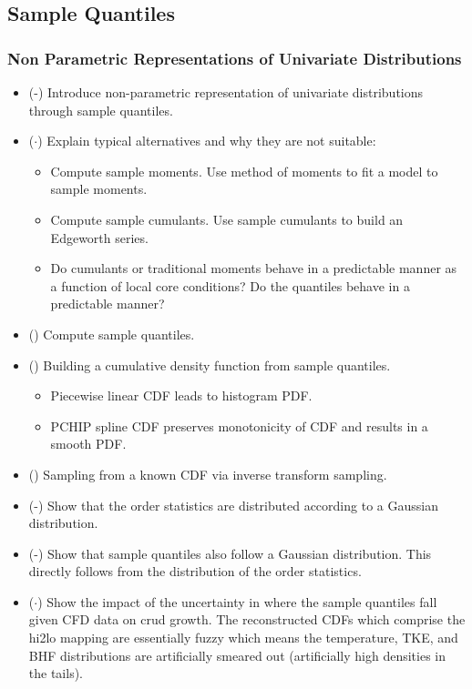 \subsection{Sample Quantiles}

\subsubsection{Non Parametric Representations of Univariate Distributions}

\begin{itemize}
    \item (\checkmark-) Introduce non-parametric representation of univariate distributions through sample quantiles.
    \item ($\cdot$) Explain typical alternatives and why they are not suitable:
        \begin{itemize}
            \item Compute sample moments.  Use method of moments to fit a model to sample moments.
            \item Compute sample cumulants.  Use sample cumulants to build an Edgeworth series.
            \item Do cumulants or traditional moments behave in a predictable manner as a function of local core conditions?  Do the quantiles behave in a predictable manner?
        \end{itemize}
\end{itemize}

\begin{itemize}
        \item (\checkmark) Compute sample quantiles.
        \item (\checkmark) Building a cumulative density function from sample quantiles.
        \begin{itemize}
           \item Piecewise linear CDF leads to histogram PDF.
           \item PCHIP spline CDF preserves monotonicity of CDF and results in a smooth PDF. \cite{Fritsch80}
        \end{itemize}
        \item (\checkmark) Sampling from a known CDF via inverse transform sampling.
        \item (\checkmark-) Show that the order statistics are distributed according to a Gaussian distribution.
        \item (\checkmark-) Show that sample quantiles also follow a Gaussian distribution.  This directly follows from the distribution of the order statistics.
        \item ($\cdot$) Show the impact of the uncertainty in where the sample quantiles fall given CFD data on crud growth.  The reconstructed CDFs which comprise the hi2lo mapping are essentially fuzzy which means the temperature, TKE, and BHF distributions are artificially smeared out (artificially high densities in the tails).
\end{itemize}

